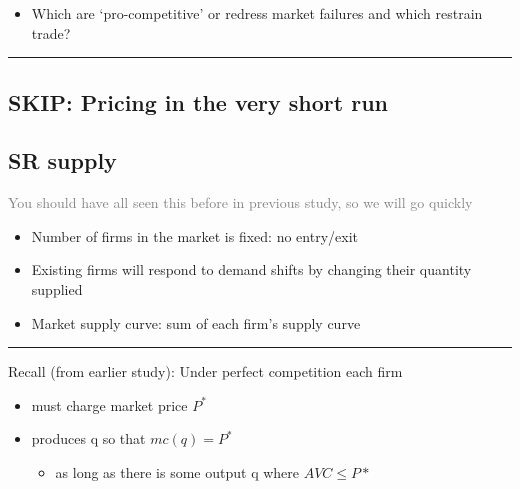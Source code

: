 \documentclass[]{article}
\providecommand{\tightlist}{%
  \setlength{\itemsep}{0pt}\setlength{\parskip}{0pt}}
\begin{document}
\begin{itemize}
\tightlist
\item
  Which are `pro-competitive' or redress market failures and which restrain trade?
\end{itemize}

\begin{center}\rule{0.5\linewidth}{\linethickness}\end{center}

\hypertarget{skip-pricing-in-the-very-short-run}{%
\subsection{SKIP: Pricing in the very short run}\label{skip-pricing-in-the-very-short-run}}

\hypertarget{sr-supply}{%
\subsection{SR supply}\label{sr-supply}}

\textcolor{gray}{You should have all seen this before in previous study, so we will go quickly}

\begin{itemize}
\item
  Number of firms in the market is fixed: no entry/exit
\item
  Existing firms will respond to demand shifts by changing their quantity supplied
\item
  Market supply curve: sum of each firm's supply curve
\end{itemize}

\begin{center}\rule{0.5\linewidth}{\linethickness}\end{center}

Recall (from earlier study): Under perfect competition each firm

\begin{itemize}
\tightlist
\item
  must charge market price \(P^*\)
\item
  produces q so that \(mc(q)=P^*\)

  \begin{itemize}
  \tightlist
  \item
    as long as there is some output q where \(AVC \leq P*\)
  \end{itemize}
\end{itemize}

\bigskip
\end{document}
